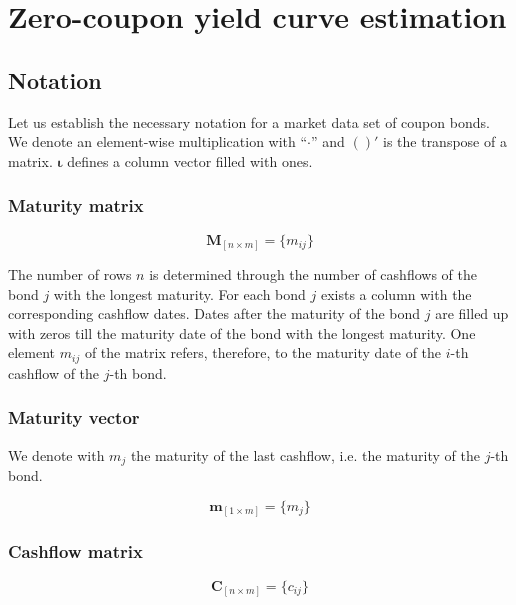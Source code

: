 \section{Zero-coupon yield curve estimation}

\subsection{Notation}
\label{sec:notation}

Let us establish the necessary notation for a market data set of coupon bonds. We denote an element-wise multiplication with ``$\cdot$'' and $( )'$ is the transpose of a matrix. $\bm{\iota}$ defines a column vector filled with ones.

\subsubsection*{Maturity matrix}

\begin{equation*}\label{maturitym}
\bm{M}_{\left[n\times m\right]}= \{m_{ij}\}
\end{equation*}

The number of rows $n$ is determined through the number of cashflows of the bond $j$ with the longest maturity. For each bond $j$ exists a column with the corresponding cashflow dates. Dates after the maturity of the bond $j$ are filled up with zeros till the maturity date of the bond with the longest maturity. One element $m_{ij}$ of the matrix  refers, therefore, to the maturity date of  the $i$-th cashflow of the $j$-th bond. 

\subsubsection*{Maturity vector}

We denote with $m_j$ the maturity of the last cashflow, i.e. the maturity of the $j$-th bond.

\begin{equation*}\label{weights}
    \bm{m}_{\left[1\times m\right]}= \{m_j\}
\end{equation*}

\subsubsection*{Cashflow matrix}


 \begin{equation*}\label{cashflowm}
\bm{C}_{\left[n\times m\right]}= \{c_{ij}\}
\end{equation*}

